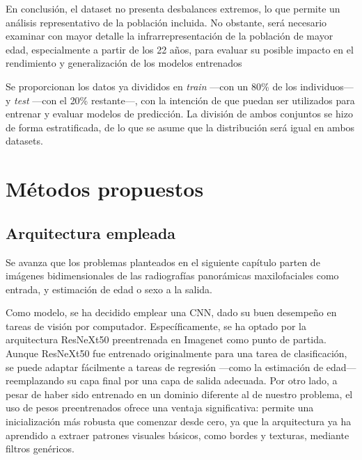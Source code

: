 En conclusión, el dataset no presenta desbalances extremos, lo que permite un análisis representativo de la población incluida. No obstante, será necesario examinar con mayor detalle la infrarrepresentación de la población de mayor edad, especialmente a partir de los 22 años, para evaluar su posible impacto en el rendimiento y generalización de los modelos entrenados

Se proporcionan los datos ya divididos en \textit{train} ---con un 80\% de los individuos--- y \textit{test} ---con el 20\% restante---, con la intención de que puedan ser utilizados para entrenar y evaluar modelos de predicción. La división de ambos conjuntos se hizo de forma estratificada, de lo que se asume que la distribución será igual en ambos datasets. 

\FloatBarrier



\section{Métodos propuestos}

\subsection{Arquitectura empleada}

Se avanza que los problemas planteados en el siguiente capítulo parten de imágenes bidimensionales de las radiografías panorámicas maxilofaciales como entrada, y estimación de edad o sexo a la salida.

Como modelo, se ha decidido emplear una CNN, dado su buen desempeño en tareas de visión por computador. Específicamente, se ha optado por la arquitectura ResNeXt50 \cite{xie2017} preentrenada en Imagenet \cite{deng2009} como punto de partida. Aunque ResNeXt50 fue entrenado originalmente para una tarea de clasificación, se puede adaptar fácilmente a tareas de regresión ---como la estimación de edad--- reemplazando su capa final por una capa de salida adecuada. Por otro lado, a pesar de haber sido entrenado en un dominio diferente al de nuestro problema, el uso de pesos preentrenados ofrece una ventaja significativa: permite una inicialización más robusta que comenzar desde cero, ya que la arquitectura ya ha aprendido a extraer patrones visuales básicos, como bordes y texturas, mediante filtros genéricos.

